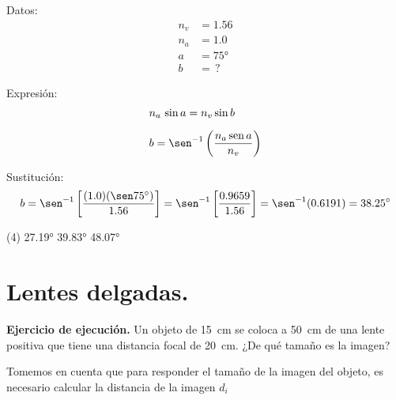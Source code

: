 \documentclass[12pt, letter]{exam}
\begin{document}
\begin{questions}
    \begin{minipage}[t]{0.35\linewidth}
    Datos: 
    \begin{align*}
    n_{v} &= 1.56 \\
    n_{a} &= 1.0 \\
    a &= \ang{75} \\
    b &= \, ?
    \end{align*}
    \end{minipage}
    \hspace{1cm}
    \begin{minipage}[t]{0.4\linewidth}
    Expresión:
    \begin{align*}
    &n_{a} \, \sin a = n_{v} \sin b \\[0.5em]
    &b = \sen^{-1} \left(\dfrac{n_{a} \, \text{sen} \, a}{n_{v}} \right)
    \end{align*}
    \end{minipage}

    Sustitución:
    \begin{align*}
    b = \sen^{-1} \left[ \dfrac{(1.0)(\sen \ang{75})}{1.56} \right] = \sen^{-1} \left[ \dfrac{0.9659}{1.56} \right] = \sen^{-1} (0.6191) = \ang{38.25}
    \end{align*}

    \vspace{0.4cm}
    \begin{tasks}(4)
        \task \ang{27.19}
        \task \ang{39.83}
        \task {}
        \task \ang{48.07}
    \end{tasks}

    \setcounter{section}{6}
    \section{Lentes delgadas.}

    \setcounter{question}{18} \question \textbf{Ejercicio de ejecución. } Un objeto de \SI{15}{\centi\meter} se coloca a \SI{50}{\centi\meter} de una lente positiva que tiene una distancia focal de \SI{20}{\centi\meter}. ¿De qué tamaño es la imagen?
    
    Tomemos en cuenta que para responder el tamaño de la imagen del objeto, es necesario calcular la distancia de la imagen $d_{i}$


\end{questions}
\end{document}

